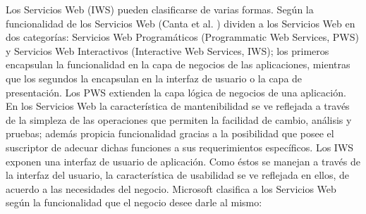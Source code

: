 \documentclass[12pt,letterpaper,titlepage]{article}
\begin{document}
%
%
%
%

Los Servicios Web (IWS) pueden clasificarse de varias formas. Según la funcionalidad de los Servicios Web (Canta et al. \cite{121}) dividen a los Servicios Web en dos categorías: Servicios Web Programáticos (Programmatic Web Services, PWS) y Servicios Web Interactivos (Interactive Web Services, IWS); los primeros encapsulan la funcionalidad en la capa de negocios de las aplicaciones, mientras que los segundos la encapsulan en la interfaz de usuario o la capa de presentación. Los PWS extienden la capa lógica de negocios de una aplicación. En los Servicios Web la característica de mantenibilidad se ve reflejada a través de la simpleza de las operaciones que permiten la facilidad de cambio, análisis y pruebas; además propicia funcionalidad gracias a la posibilidad que posee el suscriptor de adecuar dichas funciones a sus requerimientos específicos. Los IWS exponen una interfaz de usuario de aplicación. Como éstos se manejan a través de la interfaz del usuario, la característica de usabilidad se ve reflejada en ellos, de acuerdo a las necesidades del negocio. Microsoft \cite{121} clasifica a los Servicios Web según la funcionalidad que el negocio desee darle al mismo:\\
\end{document}
